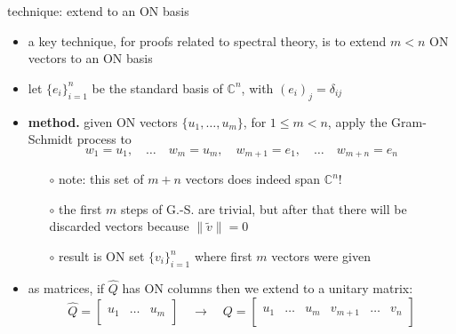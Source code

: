 \documentclass[10pt,hyperref]{beamer}
\newcommand{\CC}{\mathbb{C}}
\newcommand{\trefmatrixtwo}[2]{\left[\begin{array}{c|c|c} & & \\ #1 & \dots & #2 \\ & & \end{array}\right]}
\newcommand{\trefmatrixgroups}[4]{\left[\begin{array}{c|c|c|c|c|c} & & & & & \\ #1 & \dots & #2 & #3 & \dots & #4 \\ & & & & & \end{array}\right]}
\begin{document}
\begin{frame}{technique: extend to an ON basis}

\begin{itemize}
\item a key technique, for proofs related to spectral theory, is to extend $m<n$ ON vectors to an ON basis
\item let $\{e_i\}_{i=1}^n$ be the standard basis of $\CC^n$, with $(e_i)_j = \delta_{ij}$
\item \textbf{method.} given ON vectors $\{u_1,\dots,u_m\}$, for $1 \le m<n$, apply the Gram-Schmidt process to
    $$w_1=u_1, \quad \dots \quad w_m=u_m, \quad w_{m+1}=e_1, \quad \dots \quad w_{m+n}=e_n$$

\vspace{-2mm}
    \begin{itemize}
    \item[$\circ$] note: this set of $m+n$ vectors does indeed span $\CC^n$!
    \item[$\circ$] the first $m$ steps of G.-S. are trivial, but after that there will be discarded vectors because $\|\tilde v\|=0$
    \item[$\circ$] result is ON set $\{v_i\}_{i=1}^n$ where first $m$ vectors were given
    \end{itemize}
\item as matrices, if $\hat Q$ has ON columns then we extend to a unitary matrix:
\small
    $$\hat Q = \trefmatrixtwo{u_1}{u_m} \quad \to \quad Q = \trefmatrixgroups{u_1}{u_m}{v_{m+1}}{v_n}$$
\end{itemize}
\end{frame}
\end{document}
